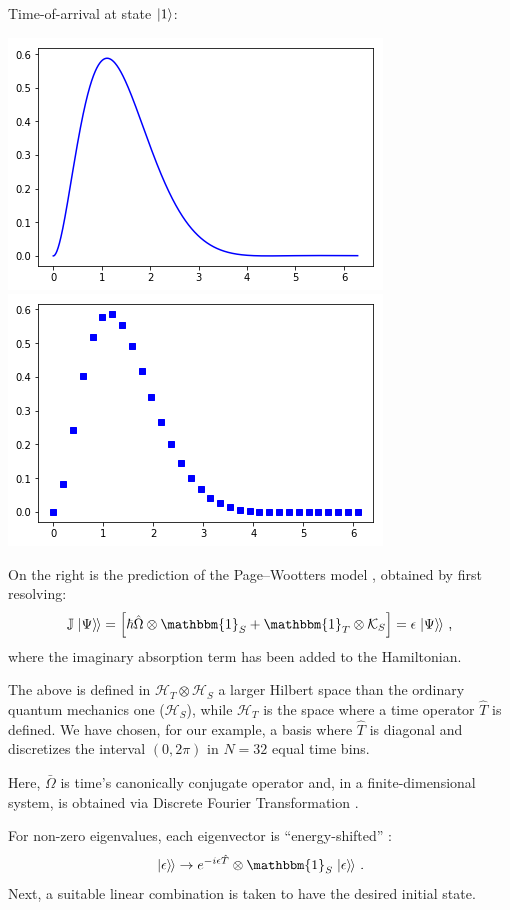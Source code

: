 \documentclass[a0,landscape]{a0poster}
\newcommand{\idop}{\mathbbm{1}}           %
\newcommand{\hilb}[1]{\mathcal{#1}}       %
\newcommand{\ox}{\otimes}
\newcommand{\smallback}{\hspace{-0.115em}}
\newcommand{\dket}[1]{\left.\left| #1 \right\rangle\smallback\right\rangle}
\newcommand{\pwspace}{\hilb{H}_T \ox \hilb{H}_S}
\begin{document}
\begin{multicols}{3}
Time-of-arrival at state $\ket{1}$:
\begin{center}\vspace{1cm}
  \includegraphics[width=0.4\linewidth]{2ldetect/toa-cont.png}
  \includegraphics[width=0.4\linewidth]{2ldetect/toa-pw.png}
\end{center}\vspace{1cm}
On the right is the prediction of the Page--Wootters model \cite{Lloyd:Time},
obtained by first resolving:
\begin{equation}
  \mathbb{J} \dket{\Psi} = \left[ \hbar\hat{\Omega}\ox\idop_S + \idop_T\ox\mathcal{K}_S \right] = \epsilon\dket{\Psi} \,\text{,}
\end{equation}
where the imaginary absorption term has been added to the Hamiltonian.

The above is defined in $\pwspace$ a larger Hilbert space than
the ordinary quantum mechanics one ($\hilb{H}_S$), while $\hilb{H}_T$
is the space where
a time operator $\hat{T}$ is defined. We have chosen, for our example,
a basis where $\hat{T}$
is diagonal and discretizes the interval $(0, 2\pi)$ in $N=32$
equal time bins.

Here, $\bar\Omega$ is time's canonically conjugate operator and,
in a finite-dimensional system, is obtained via Discrete Fourier Transformation
\cite{FiniteHilb}.

For non-zero eigenvalues, each eigenvector
is ``energy-shifted'' \cite{Lloyd:Time}:
\begin{equation}\label{eq:energyfix}
  \dket{\epsilon} \rightarrow e^{-i\epsilon\hat{T}} \ox \idop_S \dket{\epsilon}
  \,\text{.}
\end{equation}
Next, a suitable linear combination is taken to have the desired initial state.


\end{multicols}
\end{document}
